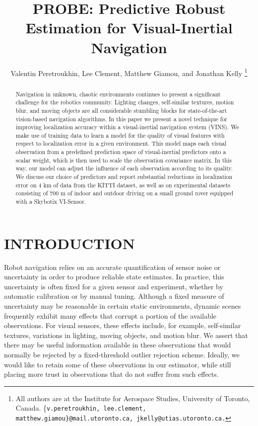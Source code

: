 \documentclass[letterpaper, 10 pt, conference]{ieeeconf}  %
\title{\LARGE \bf
PROBE: Predictive Robust Estimation for Visual-Inertial Navigation
}
\author{Valentin Peretroukhin, Lee Clement, Matthew Giamou, and Jonathan Kelly%
\thanks{All authors are at the Institute for Aerospace Studies,  University of Toronto, Canada. \{\tt\small v.peretroukhin, lee.clement, matthew.giamou\}@mail.utoronto.ca, \tt\small jkelly@utias.utoronto.ca.}}
\begin{document}
\maketitle
\thispagestyle{empty}
\pagestyle{empty}


\begin{abstract}
Navigation in unknown, chaotic environments continues to present a significant challenge for the robotics community.
Lighting changes, self-similar textures, motion blur, and moving objects are all considerable stumbling blocks for state-of-the-art vision-based navigation algorithms.
In this paper we present a novel technique for improving localization accuracy within a visual-inertial navigation system (VINS).
We make use of training data to learn a model for the quality of visual features with respect to localization error in a given environment.
This model maps each visual observation from a predefined prediction space of visual-inertial predictors onto a scalar weight, which is then used to scale the observation covariance matrix.
In this way, our model can adjust the influence of each observation according to its quality.
We discuss our choice of predictors and report substantial reductions in localization error on 4 km of data from the KITTI dataset, as well as on experimental datasets consisting of 700 m of indoor and outdoor driving on a small ground rover equipped with a Skybotix VI-Sensor.
\end{abstract}



\section{INTRODUCTION}
Robot navigation relies on an accurate quantification of sensor noise or uncertainty in order to produce reliable state estimates.
In practice, this uncertainty is often fixed for a given sensor and experiment, whether by automatic calibration or by manual tuning.
Although a fixed measure of uncertainty may be reasonable in certain static environments, dynamic scenes frequently exhibit many effects that corrupt a portion of the available observations.
For visual sensors, these effects include, for example, self-similar textures, variations in lighting, moving objects, and motion blur. 
We assert that there may be useful information available in these observations that would normally be rejected by a fixed-threshold outlier rejection scheme. 
Ideally, we would like to retain some of these observations in our estimator, while still placing more trust in observations that do not suffer from such effects.
\end{document}
